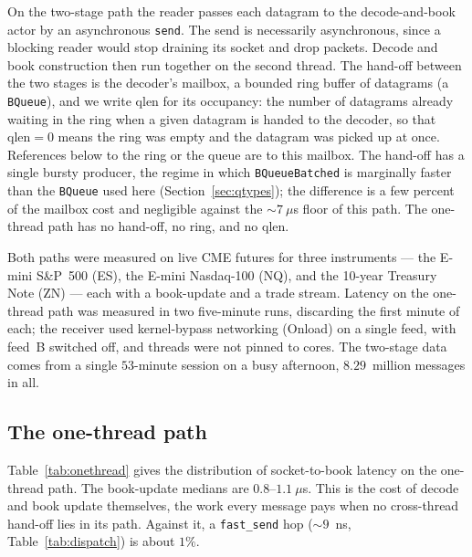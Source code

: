 \documentclass[11pt]{article}
\newcommand{\fs}{\texttt{fast\_send}}
\newcommand{\snd}{\texttt{send}}
\begin{document}
On the two-stage path the reader passes each datagram to the decode-and-book
actor by an asynchronous \snd{}. The send is necessarily asynchronous, since a
blocking reader would stop draining its socket and drop packets. Decode and book
construction then run together on the second thread. The hand-off between the
two stages is the decoder's mailbox, a bounded ring buffer of datagrams (a
\texttt{BQueue}), and we write $\text{qlen}$ for its occupancy: the number of
datagrams already waiting in the ring when a given datagram is handed to the
decoder, so that $\text{qlen}=0$ means the ring was empty and the datagram was
picked up at once. References below to the ring or the queue are to this
mailbox. The hand-off has a single bursty producer, the regime in which
\texttt{BQueueBatched} is marginally faster than the \texttt{BQueue} used here
(Section~\ref{sec:qtypes}); the difference is a few percent of the mailbox cost
and negligible against the $\sim\!7~\mu$s floor of this path. The one-thread path
has no hand-off, no ring, and no $\text{qlen}$.

Both paths were measured on live CME futures for three instruments --- the
E-mini S\&P~500 (ES), the E-mini Nasdaq-100 (NQ), and the 10-year Treasury Note
(ZN) --- each with a book-update and a trade stream. Latency on the one-thread
path was measured in two five-minute runs, discarding the first minute of each;
the receiver used kernel-bypass networking (Onload) on a single feed, with
feed~B switched off, and threads were not pinned to cores. The two-stage data
comes from a single $53$-minute session on a busy afternoon, $8.29$~million
messages in all.

\subsection{The one-thread path}
\label{sec:onethread}

Table~\ref{tab:onethread} gives the distribution of socket-to-book latency on
the one-thread path. The book-update medians are $0.8$--$1.1~\mu$s. This is the
cost of decode and book update themselves, the work every message pays when no
cross-thread hand-off lies in its path. Against it, a \fs{} hop ($\sim\!9$~ns,
Table~\ref{tab:dispatch}) is about $1\%$.
\end{document}
